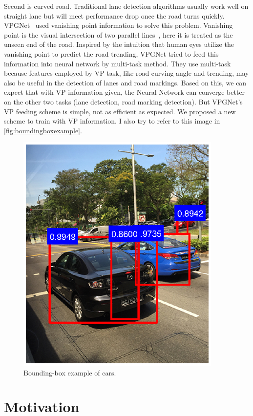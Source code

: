 \begin{spacing}{1.5}
Second is curved road. Traditional lane detection algorithms usually work well on straight lane but will meet performance drop once the road turns quickly. VPGNet~\cite{lee2017vpgnet} used vanishing point information to solve this problem. Vanishing point is the visual intersection of two parallel lines~\cite{barnard1983interpreting}, here it is treated as the unseen end of the road.  Inspired by the intuition that human eyes utilize the vanishing point to predict the road trending, VPGNet tried to feed this information into neural network by multi-task method. They use multi-task because features employed by VP task, like road curving angle and trending, may also be useful in the detection of lanes and road markings. Based on this, we can expect that with VP information given, the Neural Network can converge better on the other two tasks (lane detection, road marking detection). But VPGNet’s VP feeding scheme is simple, not as efficient as expected. We proposed a new scheme to train with VP information. I also try to refer to this image in \autoref{fig:boundingboxexample}.


\begin{figure}[ht]
\centering
\includegraphics[width=4in, fbox]{Chapter1/boundingbox.eps}
\caption{Bounding-box example of cars.}
\label{fig:boundingboxexample} 
\end{figure}


\section{Motivation}


\end{spacing}
